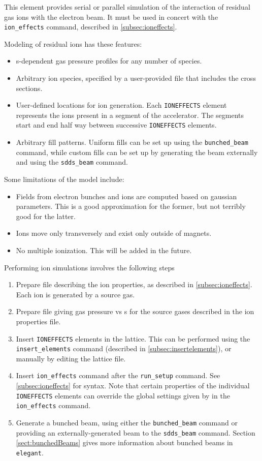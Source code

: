 This element provides serial or parallel simulation of the interaction of residual gas ions
with the electron beam.
It must be used in concert with the \verb|ion_effects| command, described in \ref{subsec:ioneffects}.

Modeling of residual ions has these features:
\begin{itemize}
\item s-dependent gas pressure profiles for any number of species.
\item Arbitrary ion species, specified by a user-provided file that includes the cross sections.
\item User-defined locations for ion generation. Each \verb|IONEFFECTS| element represents the
      ions present in a segment of the accelerator. The segments start and end half way between
      successive \verb|IONEFFECTS| elements.
\item Arbitrary fill patterns. Uniform fills can be set up using the \verb|bunched_beam| command,
      while custom fills can be set up by generating the beam externally and using the \verb|sdds_beam| command.
\end{itemize}

Some limitations of the model include:
\begin{itemize}
\item Fields from electron bunches and ions are computed based on gaussian parameters. 
      This is a good approximation for the former, but not terribly good for the latter.
\item Ions move only transversely and exist only outside of magnets.
\item No multiple ionization. This will be added in the future.
\end{itemize}

Performing ion simulations involves the following steps
\begin{enumerate}
\item Prepare file describing the ion properties, as described in \ref{subsec:ioneffects}.
  Each ion is generated by a source gas.
\item Prepare file giving gas pressure vs s for the source gases described in the ion 
  properties file.
\item Insert \verb|IONEFFECTS| elements in the lattice. This can be performed using the
  \verb|insert_elements| command (described in \ref{subsec:insertelements}), or
  manually by editing the lattice file.
\item Insert \verb|ion_effects| command after the \verb|run_setup| command. See
  \ref{subsec:ioneffects} for syntax.
  Note that certain properties of the individual \verb|IONEFFECTS| elements can override the
  global settings given by in the \verb|ion_effects| command.
\item Generate a bunched beam, using either the \verb|bunched_beam| command or providing
  an externally-generated beam to the \verb|sdds_beam| command. Section \ref{sect:bunchedBeams}
  gives more information about bunched beams in \verb|elegant|.
\end{enumerate}


